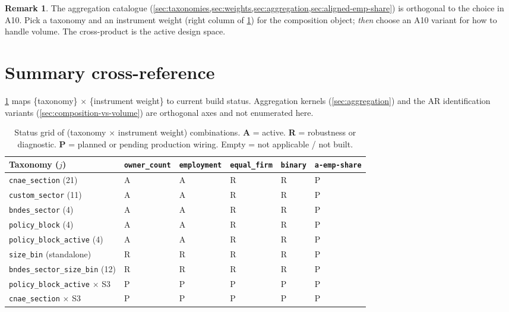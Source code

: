 \documentclass[12pt]{article}
\theoremstyle{definition}
\newtheorem{remark}{Remark}
\begin{document}
\begin{remark}
The aggregation catalogue (\cref{sec:taxonomies,sec:weights,sec:aggregation,sec:aligned-emp-share}) is orthogonal to the choice in A10. Pick a taxonomy and an instrument weight (right column of \cref{tab:summary}) for the composition object; \emph{then} choose an A10 variant for how to handle volume. The cross-product is the active design space.
\end{remark}

\section{Summary cross-reference}
\label{sec:summary}

\cref{tab:summary} maps \{taxonomy\} $\times$ \{instrument weight\} to current build status. Aggregation kernels (\cref{sec:aggregation}) and the AR identification variants (\cref{sec:composition-vs-volume}) are orthogonal axes and not enumerated here.

\begin{table}[h!]
\centering
\caption{Status grid of (taxonomy $\times$ instrument weight) combinations. \textbf{A} = active. \textbf{R} = robustness or diagnostic. \textbf{P} = planned or pending production wiring. Empty = not applicable / not built.}
\label{tab:summary}
\small
\begin{tabularx}{\textwidth}{@{}l *{5}{>{\centering\arraybackslash}X}@{}}
\toprule
\textbf{Taxonomy ($j$)} & \texttt{owner\_count} & \texttt{employment} & \texttt{equal\_firm} & \texttt{binary} & \texttt{a-emp-share}\newline{\small (\cref{sec:aligned-emp-share})}\\
\midrule
\texttt{cnae\_section} (21)             & A & A & R & R & P \\
\texttt{custom\_sector} (11)            & A & A & R & R & P \\
\texttt{bndes\_sector} (4)              & A & A & R & R & P \\
\texttt{policy\_block} (4)              & A & A & R & R & P \\
\texttt{policy\_block\_active} (4)      & A & A & R & R & P \\
\texttt{size\_bin} (standalone)         & R & R & R & R & P \\
\texttt{bndes\_sector\_size\_bin} (12)  & R & R & R & R & P \\
\texttt{policy\_block\_active} $\times$ S3 & P & P & P & P & P \\
\texttt{cnae\_section} $\times$ S3 & P & P & P & P & P \\
\bottomrule
\end{tabularx}
\end{table}
\end{document}
